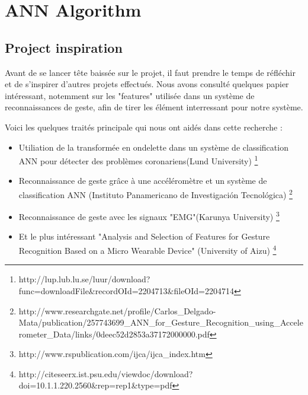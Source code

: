 
\chapter{ANN Algorithm} %

\label{Chapitre 3} %


\section{Project inspiration}
Avant de se lancer tête baissée sur le projet, il faut prendre le temps de réfléchir et de s'inspirer d'autres projets effectués. Nous avons consulté quelques papier intéressant, notemment sur les "features" utilisée dans un système de reconnaissances de geste, afin de tirer les élément interressant pour notre système.

Voici les quelques traités principale qui nous ont aidés dans cette recherche :

\begin{itemize}
\item Utiliation de la transformée en ondelette dans un système de classification ANN pour détecter des problèmes coronariens(Lund University) \footnote{http://lup.lub.lu.se/luur/download?func=downloadFile\&recordOId=2204713\&fileOId=2204714}
\item Reconnaissance de geste grâce à une accéléromètre et un système de classification ANN (Instituto Panamericano de Investigación Tecnológica)
\footnote{ http://www.researchgate.net/profile/Carlos\_Delgado-Mata/publication/257743699\_ANN\_for\_Gesture\_Recognition\_using\_Accelerometer\_Data/links/0deec52d2853a37172000000.pdf}
\item Reconnaissance de geste avec les signaux "EMG"(Karunya University) \footnote{http://www.rspublication.com/ijca/ijca\_index.htm}
\item Et le plus intéressant "Analysis and Selection of Features for Gesture Recognition Based on a Micro Wearable Device" (University of Aizu) \footnote{http://citeseerx.ist.psu.edu/viewdoc/download?doi=10.1.1.220.2560\&rep=rep1\&type=pdf}
\end{itemize}


